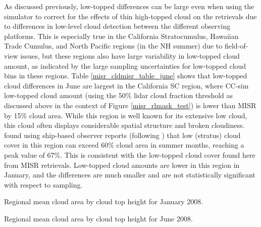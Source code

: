 As discussed previously, low-topped differences can be large even when using the simulator to correct for the effects of thin high-topped cloud on the retrievals due to differences in low-level cloud detection between the different observing platforms. This is especially true in the California Stratocumulus, Hawaiian Trade Cumulus, and North Pacific regions (in the NH summer) due to field-of-view issues, but these regions also have large variability in low-topped cloud amount, as indicated by the large sampling uncertainties for low-topped cloud bins in these regions. Table \ref{misr_cldmisr_table_june} shows that low-topped cloud differences in June are largest in the California SC region, where CC-sim low-topped cloud amount (using the 50\% lidar cloud fraction threshold as discussed above in the context of Figure \ref{misr_rlmask_test}) is lower than MISR by 15\% cloud area. While this region is well known for its extensive low cloud, this cloud often displays considerable spatial structure and broken cloudiness. \cite{klein_and_hartmann_1993} found using ship-based observer reports (following \cite{warren_et_al_1986, warren_et_al_1988}) that low (stratus) cloud cover in this region can exceed 60\% cloud area in summer months, reaching a peak value of 67\%. This is consistent with the low-topped cloud cover found here from MISR retrievals. Low-topped cloud amounts are lower in this region in January, and the differences are much smaller and are not statistically significant with respect to sampling.

\begin{table}
\centering

\caption{Regional mean cloud area by cloud top height for January 2008.}
\label{misr_cldmisr_table_january}
\end{table}

\begin{table}
\centering

\caption{Regional mean cloud area by cloud top height for June 2008.}
\label{misr_cldmisr_table_june}
\end{table}

